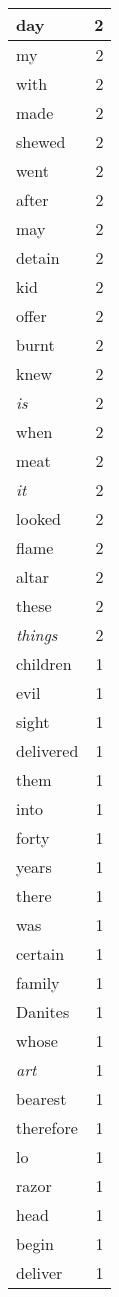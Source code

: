 \begin{center}
\begin{longtable}{l|r}
day & 2\\ \hline 
my & 2\\ \hline 
with & 2\\ \hline 
made & 2\\ \hline 
shewed & 2\\ \hline 
went & 2\\ \hline 
after & 2\\ \hline 
may & 2\\ \hline 
detain & 2\\ \hline 
kid & 2\\ \hline 
offer & 2\\ \hline 
burnt & 2\\ \hline 
knew & 2\\ \hline 
\emph{is} & 2\\ \hline 
when & 2\\ \hline 
meat & 2\\ \hline 
\emph{it} & 2\\ \hline 
looked & 2\\ \hline 
flame & 2\\ \hline 
altar & 2\\ \hline 
these & 2\\ \hline 
\emph{things} & 2\\ \hline 
children & 1\\ \hline 
evil & 1\\ \hline 
sight & 1\\ \hline 
delivered & 1\\ \hline 
them & 1\\ \hline 
into & 1\\ \hline 
forty & 1\\ \hline 
years & 1\\ \hline 
there & 1\\ \hline 
was & 1\\ \hline 
certain & 1\\ \hline 
family & 1\\ \hline 
Danites & 1\\ \hline 
whose & 1\\ \hline 
\emph{art} & 1\\ \hline 
bearest & 1\\ \hline 
therefore & 1\\ \hline 
lo & 1\\ \hline 
razor & 1\\ \hline 
head & 1\\ \hline 
begin & 1\\ \hline 
deliver & 1\\ \hline 

\end{longtable}
\end{center}
